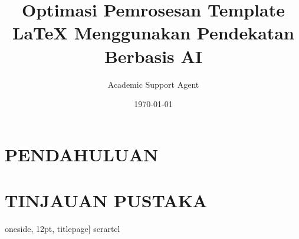\documentclass{article}
\title{Optimasi Pemrosesan Template LaTeX Menggunakan Pendekatan Berbasis AI}
\author{Academic Support Agent}
\date{\today}
\begin{document}
\maketitle

\begin{abstract}

\end{abstract}

\chapter{PENDAHULUAN}


\chapter{TINJAUAN PUSTAKA}


oneside,
12pt,
titlepage]
{scrartcl}   

\usepackage[sc]{mathpazo} %
\usepackage[T1]{fontenc}
\usepackage[utf8]{inputenc}
\usepackage[a-1b]{pdfx}
\usepackage[ngerman]{babel}
\usepackage{textcomp} 
\usepackage[amssymb]{SIunits} 

\usepackage{graphicx} 
\usepackage{subfigure}                         
\usepackage{float}
\usepackage[section]{placeins}
\usepackage{commath} %
\usepackage[iso,german]{isodate} %
\usepackage{hyperref}
\usepackage{acronym}
\usepackage{listings}

\usepackage[backend=biber, style=alphabetic]{biblatex}
\usepackage{csquotes}



\usepackage{fancyhdr}
\renewcommand{\headrulewidth}{0.5pt}
\renewcommand{\footrulewidth}{0.5pt}
\parskip6pt
\usepackage{setspace}
\onehalfspacing
\end{document}
